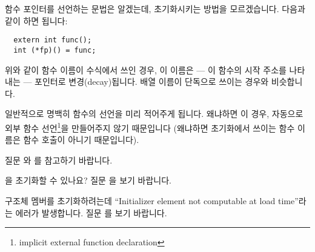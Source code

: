 \begin{faq}
	함수 포인터를 선언하는 문법은 알겠는데, 초기화시키는 방법을
	모르겠습니다.
\A
	다음과 같이 하면 됩니다:

\begin{verbatim}
  extern int func();
  int (*fp)() = func;
\end{verbatim}

	\noindent 위와 같이 함수 이름이 수식에서 쓰인 경우, 이 이름은 ---
	이 함수의 시작 주소를 나타내는 --- 포인터로 변경(decay)됩니다.
	배열 이름이 단독으로 쓰이는 경우와 비슷합니다.

	일반적으로 명백히 함수의 선언을 미리 적어주게 됩니다.  왜냐하면 이
	경우,
	자동으로 외부 함수 선언\footnote{implicit external function
	declaration}을
	만들어주지 않기 때문입니다 (왜냐하면 초기화에서 쓰이는 함수 이름은
	함수 호출이 아니기 때문입니다).  

	질문 와 를 참고하기 바랍니다.
\end{faq}

\begin{faq}
        을 초기화할 수 있나요?
\A
        질문 을 보기 바랍니다.
\end{faq}

\begin{faq}
	구조체 멤버를 초기화하려는데 ``Initializer element not computable at
        load time''라는 에러가 발생합니다.
\A
	질문 를 보기 바랍니다.
\end{faq}

%
%

